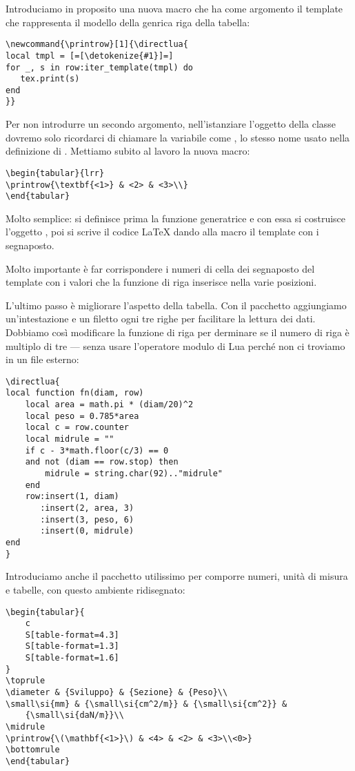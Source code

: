 Introduciamo in proposito una nuova macro  che ha come argomento il
template che rappresenta il modello della genrica riga della tabella:
\begin{Verbatim}
\newcommand{\printrow}[1]{\directlua{
local tmpl = [=[\detokenize{#1}]=]
for _, s in row:iter_template(tmpl) do
   tex.print(s)
end
}}
\end{Verbatim}

Per non introdurre un secondo argomento, nell'istanziare l'oggetto della classe
 dovremo solo ricordarci di chiamare la variabile come , lo
stesso nome usato nella definizione di . Mettiamo subito al lavoro
la nuova macro:
\begin{Verbatim}
\begin{tabular}{lrr}
\printrow{\textbf{<1>} & <2> & <3>\\}
\end{tabular}
\end{Verbatim}

Molto semplice: si definisce prima la funzione generatrice e con essa si
costruisce l'oggetto , poi si scrive il codice \LaTeX{} dando alla
macro  il template con i segnaposto.

Molto importante è far corrispondere i numeri di cella dei segnaposto del
template con i valori che la funzione di riga inserisce nella varie posizioni.

L'ultimo passo è migliorare l'aspetto della tabella. Con il pacchetto
 aggiungiamo un'intestazione e un filetto ogni tre righe per
facilitare la lettura dei dati. Dobbiamo così modificare la funzione di riga per
derminare se il numero di riga è multiplo di tre --- senza usare l'operatore
modulo \key{\%} di Lua perché non ci troviamo in un file esterno:
\begin{Verbatim}
\directlua{
local function fn(diam, row)
    local area = math.pi * (diam/20)^2
    local peso = 0.785*area
    local c = row.counter
    local midrule = ""
    if c - 3*math.floor(c/3) == 0
    and not (diam == row.stop) then
        midrule = string.char(92).."midrule"
    end
    row:insert(1, diam)
       :insert(2, area, 3)
       :insert(3, peso, 6)
       :insert(0, midrule)
end
}
\end{Verbatim}

Introduciamo anche il pacchetto  \cite{pkg:siunitx} utilissimo per
comporre numeri, unità di misura e tabelle, con questo ambiente 
ridisegnato:
\begin{Verbatim}
\begin{tabular}{
    c
    S[table-format=4.3]
    S[table-format=1.3]
    S[table-format=1.6]
}
\toprule
\diameter & {Sviluppo} & {Sezione} & {Peso}\\
\small\si{mm} & {\small\si{cm^2/m}} & {\small\si{cm^2}} &
    {\small\si{daN/m}}\\
\midrule
\printrow{\(\mathbf{<1>}\) & <4> & <2> & <3>\\<0>}
\bottomrule
\end{tabular}
\end{Verbatim}

